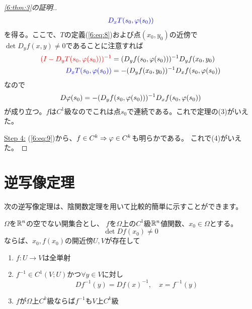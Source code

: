 \documentclass[report]{jlreq}
\begin{document}
\begin{proof}[\cref{6:thm:3}の証明.]
\begin{equation}
\begin{split}
                    \textcolor{blue}{D_x T(s_0, \varphi(s_0))}
        \end{split}
    \end{equation}
    を得る。ここで、$T$の定義(\ref{6:eq:8})および点$(x_0, y_0)$の近傍で
    $\det D_y f(x, y) \neq 0$であることに注意すれば
    \begin{equation}
        \begin{split}
            \textcolor{red}{(I - D_y T(s_0, \varphi(s_0)))^{-1}}
                &= (D_y f(s_0, \varphi(s_0)))^{-1} D_y f(x_0, y_0) \\
            \textcolor{blue}{D_x T(s_0, \varphi(s_0))}
                &= - (D_y f(x_0, y_0))^{-1} D_x f(s_0, \varphi(s_0))
        \end{split}
    \end{equation}
    なので
    \begin{equation}
        D \varphi(s_0) = - (D_y f(s_0, \varphi(s_0)))^{-1} D_x f(s_0, \varphi(s_0))
        \label{6:eq:9}
    \end{equation}
    が成り立つ。$f$は$C^1$級なのでこれは点$s_0$で連続である。これで定理の(3)がいえた。

    \underline{Step 4:}
    (\ref{6:eq:9})から、$f \in C^k \Rightarrow \varphi \in C^k$も明らかである。
    これで(4)がいえた。
\end{proof}


%
\section{逆写像定理}

次の逆写像定理は、陰関数定理を用いて比較的簡単に示すことができます。

\begin{theorem}[逆写像定理]
    $\Omega$を$\mathbb{R}^n$の空でない開集合とし、
    $f$を$\Omega$上の$C^1$級$\mathbb{R}^n$値関数、$x_0 \in \Omega$とする。
    \begin{equation}
        \det D f(x_0) \neq 0
    \end{equation}
    ならば、$x_0, f(x_0)$の開近傍$U, V$が存在して
    \begin{enumerate}
        \item $f \colon U \to V$は全単射
        \item $f^{-1} \in C^1(V; U)$かつ$\forall y \in V$に対し
            \begin{equation}
                Df^{-1}(y) = Df(x)^{-1},\quad x = f^{-1}(y)
            \end{equation}
        \item $f$が$\Omega$上$C^k$級ならば$f^{-1}$も$V$上$C^k$級
    \end{enumerate}
\end{theorem}
\end{document}
